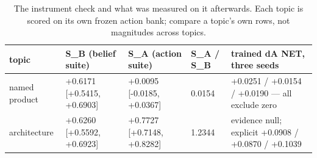 \begin{table}[htbp]
\centering
\footnotesize
\caption{The instrument check and what was measured on it afterwards. Each topic is scored on its own frozen action bank; compare a topic's own rows, not magnitudes across topics.}
\label{tab:sens}
\begin{tabular}{ llllp{4.16cm} }
\toprule
topic & S\_B (belief suite) & S\_A (action suite) & S\_A / S\_B & trained dA NET, three seeds \\
\midrule
named product & +0.6171 [+0.5415, +0.6903] & +0.0095 [-0.0185, +0.0367] & 0.0154 & +0.0251 / +0.0154 / +0.0190 — all exclude zero \\
architecture & +0.6260 [+0.5592, +0.6923] & +0.7727 [+0.7148, +0.8282] & 1.2344 & evidence null; explicit +0.0908 / +0.0870 / +0.1039 \\
\bottomrule
\end{tabular}
\end{table}
